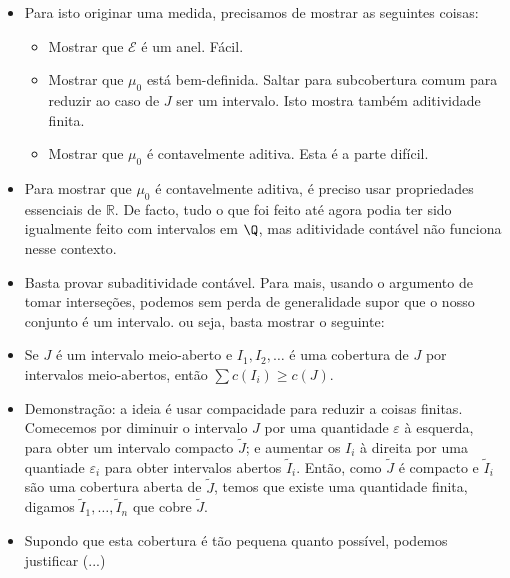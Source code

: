 \documentclass{article}
\newcommand{\R}{\mathbb{R}}
\begin{document}
\begin{itemize}
\item Para isto originar uma medida, precisamos de mostrar as seguintes coisas:
\begin{itemize}
\item Mostrar que $\mathcal E$ é um anel. Fácil.
\item Mostrar que $\mu_0$ está bem-definida. Saltar para subcobertura comum para reduzir ao caso de $J$ ser um intervalo. Isto mostra também aditividade finita.
\item Mostrar que $\mu_0$ é contavelmente aditiva. Esta é a parte difícil.
\end{itemize}
\item Para mostrar que $\mu_0$ é contavelmente aditiva, é preciso usar propriedades essenciais de $\R$. De facto, tudo o que foi feito até agora podia ter sido igualmente feito com intervalos em $\Q$, mas aditividade contável não funciona nesse contexto.
\item Basta provar subaditividade contável. Para mais, usando o argumento de tomar interseções, podemos sem perda de generalidade supor que o nosso conjunto é um intervalo. ou seja, basta mostrar o seguinte:
\item Se $J$ é um intervalo meio-aberto e $I_1, I_2, \dots$ é uma cobertura de $J$ por intervalos meio-abertos, então $\sum c(I_i) \geq c(J)$.
\item Demonstração: a ideia é usar compacidade para reduzir a coisas finitas. Comecemos por diminuir o intervalo $J$ por uma quantidade $\varepsilon$ à esquerda, para obter um intervalo compacto $\tilde J$; e aumentar os $I_i$ à direita por uma quantiade $\varepsilon_i$ para obter intervalos abertos $\tilde I_i$. Então, como $\tilde J$ é compacto e $\tilde I_i$ são uma cobertura aberta de $\tilde J$, temos que existe uma quantidade finita, digamos $\tilde I_1, \dots, \tilde I_n$ que cobre $\tilde J$.
\item Supondo que esta cobertura é tão pequena quanto possível, podemos justificar (...)
\end{itemize}
\end{document}
